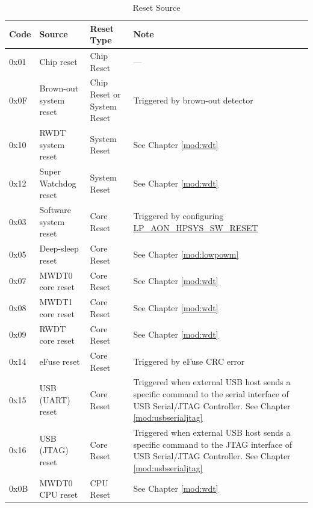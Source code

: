 \documentclass[main\_\_EN.tex]{subfiles}
\begin{document}
\begin{table}[H]
    \centering
    \caption{Reset Source}
    \label{tab:resclk-reset-src}
    \begin{threeparttable}
    \begin{tabular}{ |l|m{3.5cm}|m{1.8cm}|m{9.2cm}| }
    \hline
\rowcolor{lightgray}
\textbf{Code} & \textbf{Source} & \textbf{Reset Type} &   \textbf{Note} \\\hline
        0x01 & Chip reset\tnote{1} & Chip Reset &---\\
        \hline
        0x0F & Brown-out system reset & Chip Reset or System Reset & Triggered by brown-out detector\tnote{2}\\
        \hline
        0x10 & RWDT system reset & System Reset & See Chapter \ref{mod:wdt} \textit{\nameref{mod:wdt}}
        \\\hline
        0x12 & Super Watchdog reset & System Reset & See Chapter \ref{mod:wdt} \textit{\nameref{mod:wdt}}
        \\\hline
        0x03 & Software system reset & Core Reset & Triggered by configuring \hyperref[fielddesc:LPAONHPSYSSWRESET]{LP\_AON\_HPSYS\_SW\_RESET}\\
        \hline
        0x05 & Deep-sleep reset & Core Reset & See Chapter \ref{mod:lowpowm} \textit{\nameref{mod:lowpowm}}
        \\\hline
        0x07 & MWDT0 core reset & Core Reset & See Chapter \ref{mod:wdt} \textit{\nameref{mod:wdt}}
        \\\hline
        0x08 & MWDT1 core reset & Core Reset & See Chapter \ref{mod:wdt} \textit{\nameref{mod:wdt}}
        \\\hline
        0x09 & RWDT core reset & Core Reset & See Chapter \ref{mod:wdt} \textit{\nameref{mod:wdt}}
        \\\hline
        0x14 & eFuse reset & Core Reset & Triggered by eFuse CRC error
        \\\hline
        0x15 & USB (UART) reset & Core Reset & Triggered when external USB host sends a specific command to the serial interface of USB Serial/JTAG Controller. See Chapter \ref{mod:usbserialjtag} \textit{\nameref{mod:usbserialjtag}} \\\hline
        0x16 & USB (JTAG) reset & Core Reset & Triggered when external USB host sends a specific command to the JTAG interface of USB Serial/JTAG Controller. See Chapter \ref{mod:usbserialjtag} \textit{\nameref{mod:usbserialjtag}} \\\hline
        0x0B & MWDT0 CPU reset & CPU Reset & See Chapter \ref{mod:wdt} \textit{\nameref{mod:wdt}}

\end{tabular}
\end{threeparttable}
\end{table}
\end{document}
